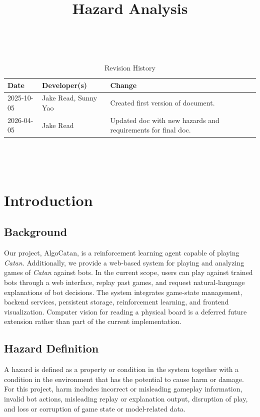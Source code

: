 \documentclass{article}
\title{Hazard Analysis\\\progname}
\author{\authname}
\date{}
\begin{document}
\maketitle
\thispagestyle{empty}

~\newpage


\begin{table}[hp]
\caption{Revision History} \label{TblRevisionHistory}
\begin{tabularx}{\textwidth}{llX}
\toprule
\textbf{Date} & \textbf{Developer(s)} & \textbf{Change}\\
\midrule
2025-10-05 & Jake Read, Sunny Yao & Created first version of document.\\
2026-04-05 & Jake Read & Updated doc with new hazards and requirements for final doc.\\

\bottomrule
\end{tabularx}
\end{table}

~\newpage

\tableofcontents
\listoftables
\listoffigures

~\newpage



\section{Introduction}\label{sec:introduction}


\subsection{Background}\label{subsec:background}

Our project, AlgoCatan, is a reinforcement learning agent capable of playing \emph{Catan}.
Additionally, we provide a web-based system for playing and analyzing games of \emph{Catan} against bots.
In the current scope, users can play against trained bots through a web interface, replay past games,
and request natural-language explanations of bot decisions.
The system integrates game-state management, backend services, persistent storage, reinforcement learning,
and frontend visualization.
Computer vision for reading a physical board is a deferred future extension rather than part of the
current implementation.

\subsection{Hazard Definition}\label{subsec:hazard-definition}
A hazard is defined as a property or condition in the system together
with a condition in the environment that has the potential to cause harm or
damage.
For this project, harm includes incorrect or misleading gameplay information,
invalid bot actions, misleading replay or explanation output, disruption of play,
and loss or corruption of game state or model-related data.
\end{document}

